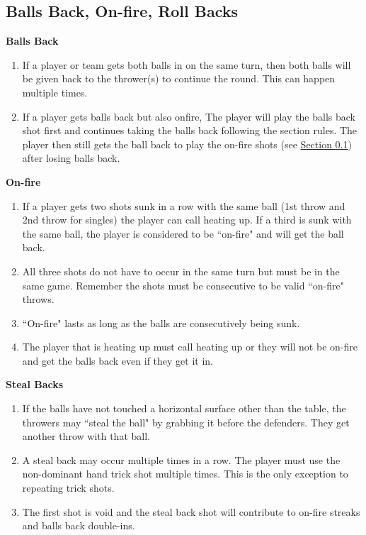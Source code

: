 	\subsection{Balls Back, On-fire, Roll Backs}\label{ssec:BallsBack}
        \noindent\textbf{Balls Back}
        \begin{enumerate}[label=(\roman*), ref=\roman*]
            \item \label{sssec:BallsBack,bothin} If a player or team gets both balls in on the same turn, then both balls will be given back to the thrower(s) to continue the round.
                This can happen multiple times.
            \item \label{sssec:BallsBack,onfire_combine} If a player gets balls back but also onfire, The player will play the balls back shot first and continues taking the balls back following the section rules.
                The player then still gets the ball back to play the on-fire shots (see \hyperref[ssec:BallsBack]{Section \ref*{ssec:BallsBack}}) after losing balls back.
        \end{enumerate}
        \noindent\textbf{On-fire}
        \begin{enumerate}[label=(\roman*), ref=\roman*]
            \item \label{sssec:BallsBack,onfire} If a player gets two shots sunk in a row with the same ball (1st throw and 2nd throw for singles) the player can call heating up.
                If a third is sunk with the same ball, the player is considered to be ``on-fire" and will get the ball back. 
            \item \label{sssec:BallsBack,onfire_reset} All three shots do not have to occur in the same turn but must be in the same game. Remember the shots must be consecutive to be valid ``on-fire" throws.
            \item \label{sssec:BallsBack,onfire_multiple} ``On-fire" lasts as long as the balls are consecutively being sunk. 
            \item \label{sssec:BallsBack,onfire_calling} The player that is heating up must call heating up or they will not be on-fire and get the balls back even if they get it in.
        \end{enumerate}
        \noindent\textbf{Steal Backs}
        \begin{enumerate}[label=(\roman*), ref=\roman*]
            \item \label{sssec:BallsBack,stealback} If the balls have not touched a horizontal surface other than the table, the throwers may ``steal the ball" by grabbing it before the defenders.
                They get another throw with that ball.
            \item \label{sssec:BallsBack,stealback_multi} A steal back may occur multiple times in a row.
                The player must use the non-dominant hand trick shot multiple times. This is the only exception to repeating trick shots.
            \item \label{sssec:BallsBack,stealback_redo} The first shot is void and the steal back shot will contribute to on-fire streaks and balls back double-ins.
        \end{enumerate}
